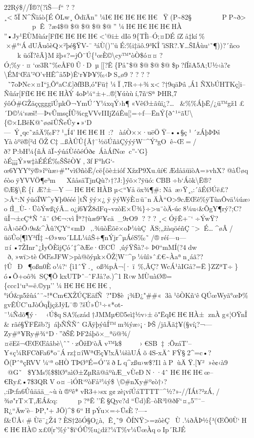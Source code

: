 22Rý\$//Ï®?(?ìŠ---ƒ``  ?  ? 
¸\textless5ÏN\^{}Ñïáò\{ÉÔL w¸ÔdïÄn''¼I€H€H€H€H€Ÿ(P\textasciitilde8 2§    
PP\textasciitilde ð\textgreater{}     pÊ?æ4\$@\$@\$@\$@\$@''¼H€H€H€H€HÀ
''•Jy¹ËÙMùár{[}FƒI€H€H€H€\textless'@i±dIö9\{TÎì--Ó;¤DÉ íZå‡kí­\%  
×\#°`ÁdUÂuôèQ×²þé§ŸV-¯³áÙ()''üÉ:\%i‡äô.9³KÎ'ìSR?.¥\ldots ŠIÅùu`˜¶))?´ñco
k
üóÏ?êÃ\}Mžþ«?=jÔ¨Ú\{¹œÈ©\textbackslash cy™"\textquotesingle òÒ\$ó¤¤?Ó;\%y·¤`œ3R˜\%eÅF0Û·D~µ{[}{[}?Ê\{På˜\$@\$@\$@\$@\$p?fÍšA5A;U½‹à?¢\textbackslash ÉM`Œã'²O'vHÊ\^{}å5Þ)Ê`r¥Þ¥‰‹ÞS„ø9
?  ?  ?  ? 
˜7oÞNc×¤I``j‚Õ°aC£{]}ðfBB‚ó"Fü†¼Ï‚7R÷+¾x\textless?†9qäÞâ,Á1ÑXbÚHTKç{]}i--Ñûár{[}FƒI€H€H€HÀÝ4oÞ¼``±+..®¦¥úùùí‚7ñ`S ª
ÞHR‚7
ýôÓ\#GŽäççgggïÚµkÖ¬YmÚ´Y¼xqÝ›h¶«V­êØ±ãûï¿?\ldots\&\%\%ÁþË/¿ü™gž1£´D©¼`sæš!---ÞvÛmsçÍÛ¾cgVVvIIIjZúÊu{[}¦=÷f---ËnÝ\{ðˆ¹``ã U\textbackslash\{©×LBëK@˜øøšÛÑeÛy•»`­D---~Ý¸qc˜zâÄ‰F?¹„Í4'H€H€H~:?àáÒ××·uëÖŸ--••§ç¹´zÁþÞÞš
Yàòºë®{[}²d
ÖŽC‡\ldots ßÀÛÛ\{Ã†¯½öÚñãÇýýýW¯\^{}Ý³gOê\textasciitilde Œ=/ð\textbar?P:bH¼\{ñÅãÏ\textasciitilde ýúáÙéôéÓð¢~ÁàÁƒ\textquotesingle Nœc''-'G\}òÉ\textquotesingle¡¡¡Ý»w‡àÉÉÉ‰ŠŠêÒ¥,3fF°hG`-œ6YYY°ÿ®»îºùæ›\#""vìØñòË/cë\{öè±iófXžzP9Xu.ûí€ÆdåäüïòA=»vhX?@àÜøqéòoÿYVVÖ¶e³m\textbar~XâåsäTjnQù?›†?J:\}ýõ×?ÿüó:CBB÷b`Áök\textbackslash Ë­®?©Æ§\textbackslash Ê\{í~Æ?±---Y---H€H€HÀBµ\textless``¥åöx¾¶\#:Nå~æ›Ÿ¸,:´âÉØÚë£?\textgreater Â``:NýüóÏW\^{}y¥þ0ééé{]}tÑÿý×¿ÿÿýWýÈ¤ü¨nÄÀ``O\textgreater9cÆŒê\%ÿTùaÔvä¼úæ›o
fÌ\_Ù-·ÜòÝwß¡ýÂ\ldots{}o¿í6¥Ž8dFq\textasciitilde vzòE×Ü¾\}÷\textgreater u¨òÄ-úc8\textbar¼u‹\&ÕgY¶rý?;\textquotesingle C?\textbar üÎ¬±cÇ*Ñˆå¨Ø€¬:vìÎª?†ùæ9²¥cä\_9rO9
?  ?  ? 
¸\textless\textbar ÓÿÊ+¯`÷ÝwŸ?öÀ›õêÕ›9s\&\^{}Àû?ÇY``«mÐ~‚.¾üòËõë×oÞ¼ùÇÄS;„žàqöéñÇ¯\textgreaterÉ\ldots\^{}øÂ/üöÛo{[}¶lY³fÍ‡\textasciitilde Ø»wo´LLL¼âŠ+¶nÝjr\^{}µÁéS‰˜/®réí---u---¤í•7ŽInr˜¿ÌyÕÈìjÇó´‡\^{}ðÆe·ŒCÜ,úýŸŠà? ÷Þ0``mMÍ(?4dw

ð,»wï\textgreater tèÖŒsJFW\textgreater pà@õýµk×ÖŽ¦W¯\^{}p¼ûî»ˆ£€\textasciitilde Àaªn¸áã??†Û\textquotesingle~Ð\textquotesingle~¶oßn0Èo¼?{}`\{ì1ˆŸ.¸~oß¾pÅ¬{[}·ï~\%‚ÂÇ?Wc\textbar Á¹àIGå?=Ë\}ZZªT÷\}ó•Õ+oô¾~SÇ¶ÕkxUTÞˆ--ˆFJå?ø.)\^{}1R‹wMÙuàØ®=\{ccc1`u³=ë.©yµ''¼H€H€H€H€,
°iÓ\&µ5žûáˆ¨\textasciitilde!*Cm€XŽÚÇEäƒÑ?"Ð\$è¡¾Ð¿"\#\#«3à¹ôÒKñ`êQÚœWyã°œÞ\%gvÊÙC'uJòÓqÎjçžJÿL¯®?šÚ»Û¹÷«*ot­¨¼Ñdõ¶ý·‹Ú\$qSA ‰zád†JMMµ€©\textquotesingle5eì‡½v›±ö"ËqI€H€HÀ±znÀg«¦OŸnÎ\&
rãé§ŸFËšb?jáþÑÑÑˆGÄÿþýûÍ™m¾ýæ›¡·ÞŠ/jãÄã‡¥(§ví¡?¬---Zy\#ª¥Ry\#¾``D·''ðŠÊÞF2áþõ×\_ªö@¾/¤ëEš¬ŒŒŒââbè\textbackslash ˆ˜·zÕžÐ`òÃv™k\$

›€SB‡~:ÕzáT'--Y«ç¼RFCðFa6*o¨Árz‡¤îWªŒç¥!xÃ¼šàUÁõ4S-\textbar xÄˆFŸ§2\^{}=c•?Õ(PˆªçRVV¼`ªoHÒTÞØ°\textbar É=Ó''šðLq\^{}zßu›w\$?I1àPùÄŸ.{[}¥²»è¢‹à9
@G˜\$YMs\%\$\$lØ°aìØ±­ZµRã@åºùÆ\_vÙeÐN··4ˆH€H€H€œ--€Ry£ •7\$3QRVo¤--ìÓR`ºòFå²¼ý\$
\textbackslash©\#nXy\#º¢ò†›?‚:íÞ:ƒa6Ûûäää\_\textasciitilde ùù®ºê*vR3+›sx
g¢zè¡víÚá\textbar TTTT¯\^{}½?»-//ÏÁt?²zÁ‚/¾ø"rT×T,ÆÁ\&q:  
p?ªÊ\textquotesingle''Ê§Qyc?d``Üd)Ê--òR³l@ðF`¤„5''¨--R¿``Äw'è--ÞP‚"+\textbarJÖ)\^{}\$ 6``HpÝu×=÷ÜsÈ?----f\&ÜÅ‹\#Ùë¯¿Ž4?ÈS†2õÓ§O¿à‚Ê¸˜9~ÕÍNŸ\textgreater=zôèÇÙ.¼ðÂÞ½\{³(ŒÕ0Ù`H€H€HÀ©
x£0{[}r'\%ý˜\$ï`ÓÛ\%u¿dž?¼T\%v¼ÜœÀqoIp´RJÉ

